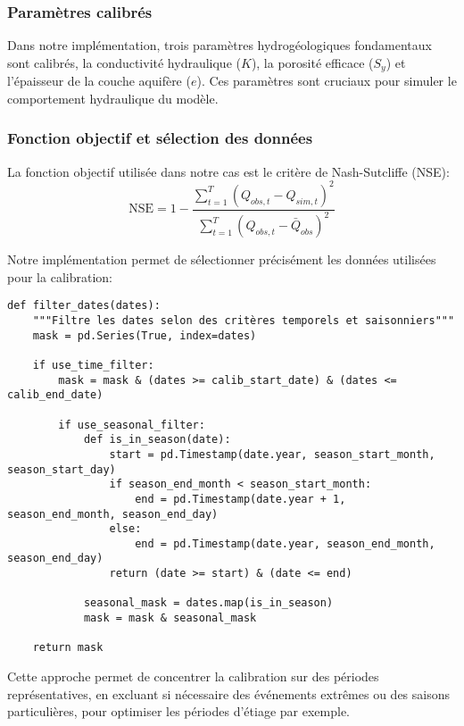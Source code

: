 \subsubsection{Paramètres calibrés}

Dans notre implémentation, trois paramètres hydrogéologiques fondamentaux sont calibrés, la conductivité hydraulique ($K$), la porosité efficace ($S_y$) et l'épaisseur de la couche aquifère ($e$). Ces paramètres sont cruciaux pour simuler le comportement hydraulique du modèle.

\subsubsection{Fonction objectif et sélection des données}

La fonction objectif utilisée dans notre cas est le critère de Nash-Sutcliffe (NSE):
\begin{equation}\label{eq:nse}
\text{NSE} = 1 - \frac{\sum_{t=1}^{T}(Q_{obs,t} - Q_{sim,t})^2}{\sum_{t=1}^{T}(Q_{obs,t} - \bar{Q}_{obs})^2}
\end{equation}

Notre implémentation permet de sélectionner précisément les données utilisées pour la calibration:

\begin{verbatim}
def filter_dates(dates):
    """Filtre les dates selon des critères temporels et saisonniers"""
    mask = pd.Series(True, index=dates)
    
    if use_time_filter:
        mask = mask & (dates >= calib_start_date) & (dates <= calib_end_date)
    
        if use_seasonal_filter:
            def is_in_season(date):
                start = pd.Timestamp(date.year, season_start_month, season_start_day)
                if season_end_month < season_start_month:
                    end = pd.Timestamp(date.year + 1, season_end_month, season_end_day)
                else:
                    end = pd.Timestamp(date.year, season_end_month, season_end_day)
                return (date >= start) & (date <= end)
            
            seasonal_mask = dates.map(is_in_season)
            mask = mask & seasonal_mask

    return mask
\end{verbatim}

Cette approche permet de concentrer la calibration sur des périodes représentatives, en excluant si nécessaire des événements extrêmes ou des saisons particulières, pour optimiser les périodes d'étiage par exemple.

